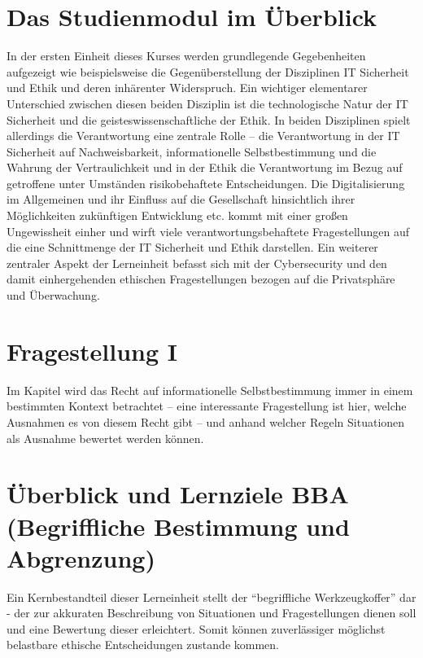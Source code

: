 \documentclass[journal]{IEEEtran}
\begin{document}

\begin{onecolumn}

\section{Das Studienmodul im Überblick}

In der ersten Einheit dieses Kurses werden grundlegende Gegebenheiten aufgezeigt wie beispielsweise
die Gegenüberstellung der Disziplinen IT Sicherheit und Ethik und deren inhärenter Widerspruch.
Ein wichtiger elementarer Unterschied zwischen diesen beiden Disziplin ist die technologische Natur
der IT Sicherheit und die geisteswissenschaftliche der Ethik. In beiden Disziplinen spielt allerdings
die Verantwortung eine zentrale Rolle – die Verantwortung in der IT Sicherheit auf Nachweisbarkeit, 
informationelle Selbstbestimmung und die Wahrung der Vertraulichkeit und in der Ethik die Verantwortung
im Bezug auf getroffene unter Umständen risikobehaftete Entscheidungen. 
Die Digitalisierung im Allgemeinen und ihr Einfluss auf die Gesellschaft hinsichtlich ihrer Möglichkeiten
zukünftigen Entwicklung etc. kommt mit einer großen Ungewissheit einher und wirft viele 
verantwortungsbehaftete Fragestellungen auf die eine Schnittmenge der IT Sicherheit und Ethik darstellen. 
Ein weiterer zentraler Aspekt der Lerneinheit befasst sich mit der Cybersecurity und den damit 
einhergehenden ethischen Fragestellungen bezogen auf die Privatsphäre und Überwachung.

\section*{Fragestellung I}

Im Kapitel wird das Recht auf informationelle Selbstbestimmung immer in einem bestimmten Kontext 
betrachtet – eine interessante Fragestellung ist hier, welche Ausnahmen es von diesem Recht gibt – und 
anhand welcher Regeln Situationen als Ausnahme bewertet werden können.

\section{Überblick und Lernziele BBA (Begriffliche Bestimmung und Abgrenzung)}

Ein Kernbestandteil dieser Lerneinheit stellt der ``begriffliche Werkzeugkoffer'' dar - der zur akkuraten 
Beschreibung von Situationen und Fragestellungen dienen soll und eine Bewertung dieser erleichtert.
Somit können zuverlässiger möglichst belastbare ethische Entscheidungen zustande kommen.


\end{onecolumn}
\end{document}

